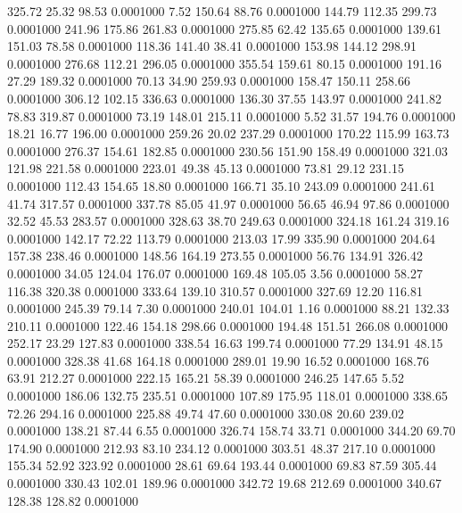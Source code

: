  325.72   25.32   98.53   0.0001000
   7.52  150.64   88.76   0.0001000
 144.79  112.35  299.73   0.0001000
 241.96  175.86  261.83   0.0001000
 275.85   62.42  135.65   0.0001000
 139.61  151.03   78.58   0.0001000
 118.36  141.40   38.41   0.0001000
 153.98  144.12  298.91   0.0001000
 276.68  112.21  296.05   0.0001000
 355.54  159.61   80.15   0.0001000
 191.16   27.29  189.32   0.0001000
  70.13   34.90  259.93   0.0001000
 158.47  150.11  258.66   0.0001000
 306.12  102.15  336.63   0.0001000
 136.30   37.55  143.97   0.0001000
 241.82   78.83  319.87   0.0001000
  73.19  148.01  215.11   0.0001000
   5.52   31.57  194.76   0.0001000
  18.21   16.77  196.00   0.0001000
 259.26   20.02  237.29   0.0001000
 170.22  115.99  163.73   0.0001000
 276.37  154.61  182.85   0.0001000
 230.56  151.90  158.49   0.0001000
 321.03  121.98  221.58   0.0001000
 223.01   49.38   45.13   0.0001000
  73.81   29.12  231.15   0.0001000
 112.43  154.65   18.80   0.0001000
 166.71   35.10  243.09   0.0001000
 241.61   41.74  317.57   0.0001000
 337.78   85.05   41.97   0.0001000
  56.65   46.94   97.86   0.0001000
  32.52   45.53  283.57   0.0001000
 328.63   38.70  249.63   0.0001000
 324.18  161.24  319.16   0.0001000
 142.17   72.22  113.79   0.0001000
 213.03   17.99  335.90   0.0001000
 204.64  157.38  238.46   0.0001000
 148.56  164.19  273.55   0.0001000
  56.76  134.91  326.42   0.0001000
  34.05  124.04  176.07   0.0001000
 169.48  105.05    3.56   0.0001000
  58.27  116.38  320.38   0.0001000
 333.64  139.10  310.57   0.0001000
 327.69   12.20  116.81   0.0001000
 245.39   79.14    7.30   0.0001000
 240.01  104.01    1.16   0.0001000
  88.21  132.33  210.11   0.0001000
 122.46  154.18  298.66   0.0001000
 194.48  151.51  266.08   0.0001000
 252.17   23.29  127.83   0.0001000
 338.54   16.63  199.74   0.0001000
  77.29  134.91   48.15   0.0001000
 328.38   41.68  164.18   0.0001000
 289.01   19.90   16.52   0.0001000
 168.76   63.91  212.27   0.0001000
 222.15  165.21   58.39   0.0001000
 246.25  147.65    5.52   0.0001000
 186.06  132.75  235.51   0.0001000
 107.89  175.95  118.01   0.0001000
 338.65   72.26  294.16   0.0001000
 225.88   49.74   47.60   0.0001000
 330.08   20.60  239.02   0.0001000
 138.21   87.44    6.55   0.0001000
 326.74  158.74   33.71   0.0001000
 344.20   69.70  174.90   0.0001000
 212.93   83.10  234.12   0.0001000
 303.51   48.37  217.10   0.0001000
 155.34   52.92  323.92   0.0001000
  28.61   69.64  193.44   0.0001000
  69.83   87.59  305.44   0.0001000
 330.43  102.01  189.96   0.0001000
 342.72   19.68  212.69   0.0001000
 340.67  128.38  128.82   0.0001000
